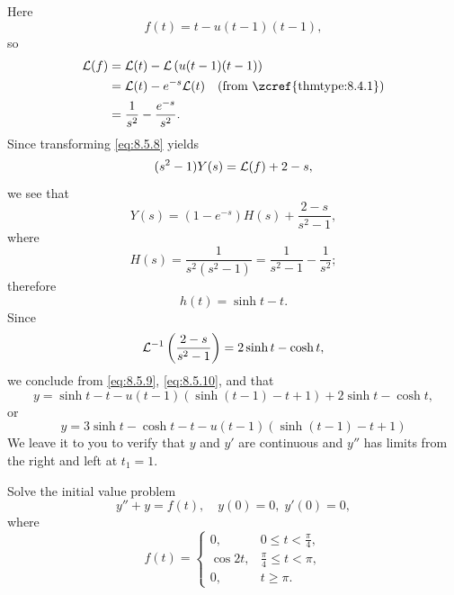 \begin{solution}
Here
\[
f(t)=t-u(t-1)(t-1),
\]
so
\begin{align*}
\laplace(f)
&=\laplace(t)-\laplace\left(u(t-1)(t-1)\right)\\
&=\laplace(t)-e^{-s}\laplace(t)\quad\text{(from \zcref{thmtype:8.4.1})}\\
&=\frac{1}{s^2}-\frac{e^{-s}}{s^2}.
\end{align*}
Since transforming  \eqref{eq:8.5.8} yields
\[
(s^2-1) Y(s)={\mathcal L}(f)+2-s,
\]
we see that
\begin{equation}\label{eq:8.5.9}
Y(s)=(1-e^{-s})H(s)+\frac{2-s}{s^2-1},
\end{equation}
where
\[
H(s)=\frac{1}{s^2(s^2-1)}=\frac{1}{s^2-1}-\frac{1}{s^2};
\]
 therefore
\begin{equation}\label{eq:8.5.10}
h(t)=\sinh t-t.
\end{equation}
Since
\[
{\mathcal L}^{-1}\left(\frac{2-s}{s^2-1}\right)=2\sinh t-\cosh t,
\]
we conclude from  \eqref{eq:8.5.9},  \eqref{eq:8.5.10}, and
 that
\[
y=\sinh t-t-u(t-1)\left(\sinh (t-1)-t+1\right)+2\sinh t-
\cosh t,
\]
or
\begin{equation}\label{eq:8.5.11}
y=3\sinh t-\cosh t-t-u(t-1)\left(\sinh (t-1)-t+1\right)
\end{equation}
We leave it to you to verify that $y$  and $y'$ are continuous and
$y''$ has limits from the right and left at
$t_1=1$.
\end{solution}


\begin{example}\label{example:8.5.4}
 Solve the initial value problem
\begin{equation}\label{eq:8.5.12}
y''+y=f(t), \quad   y(0)=0,\;  y'(0)=0,
\end{equation}
where
\[
f(t)=\begin{cases}
 0,&0\le t<\frac{\pi}{4},\\
\cos2t,&\frac{\pi}{4}\le t<\pi,\\
 0,&t\ge\pi.
\end{cases}
\]
\end{example}

